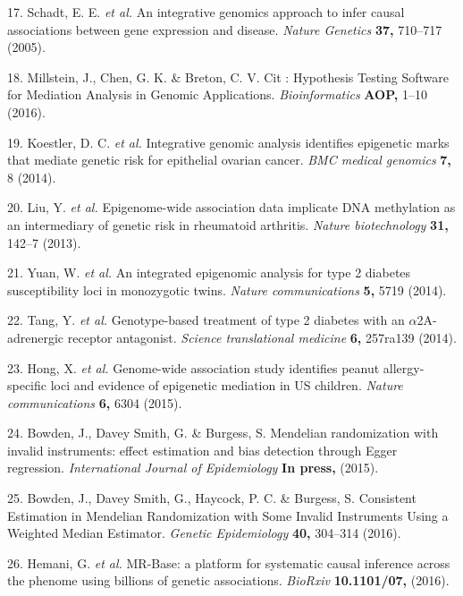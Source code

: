 \documentclass[]{article}
\begin{document}
\hypertarget{ref-Schadt2005}{}
17. Schadt, E. E. \emph{et al.} An integrative genomics approach to
infer causal associations between gene expression and disease.
\emph{Nature Genetics} \textbf{37,} 710--717 (2005).

\hypertarget{ref-Millstein2016}{}
18. Millstein, J., Chen, G. K. \& Breton, C. V. Cit : Hypothesis Testing
Software for Mediation Analysis in Genomic Applications.
\emph{Bioinformatics} \textbf{AOP,} 1--10 (2016).

\hypertarget{ref-Koestler2014}{}
19. Koestler, D. C. \emph{et al.} Integrative genomic analysis
identifies epigenetic marks that mediate genetic risk for epithelial
ovarian cancer. \emph{BMC medical genomics} \textbf{7,} 8 (2014).

\hypertarget{ref-Liu2013}{}
20. Liu, Y. \emph{et al.} Epigenome-wide association data implicate DNA
methylation as an intermediary of genetic risk in rheumatoid arthritis.
\emph{Nature biotechnology} \textbf{31,} 142--7 (2013).

\hypertarget{ref-Yuan2014}{}
21. Yuan, W. \emph{et al.} An integrated epigenomic analysis for type 2
diabetes susceptibility loci in monozygotic twins. \emph{Nature
communications} \textbf{5,} 5719 (2014).

\hypertarget{ref-Tang2014}{}
22. Tang, Y. \emph{et al.} Genotype-based treatment of type 2 diabetes
with an \(\alpha\)2A-adrenergic receptor antagonist. \emph{Science
translational medicine} \textbf{6,} 257ra139 (2014).

\hypertarget{ref-Hong2015}{}
23. Hong, X. \emph{et al.} Genome-wide association study identifies
peanut allergy-specific loci and evidence of epigenetic mediation in US
children. \emph{Nature communications} \textbf{6,} 6304 (2015).

\hypertarget{ref-Bowden2015}{}
24. Bowden, J., Davey Smith, G. \& Burgess, S. Mendelian randomization
with invalid instruments: effect estimation and bias detection through
Egger regression. \emph{International Journal of Epidemiology}
\textbf{In press,} (2015).

\hypertarget{ref-Bowden2016b}{}
25. Bowden, J., Davey Smith, G., Haycock, P. C. \& Burgess, S.
Consistent Estimation in Mendelian Randomization with Some Invalid
Instruments Using a Weighted Median Estimator. \emph{Genetic
Epidemiology} \textbf{40,} 304--314 (2016).

\hypertarget{ref-Hemani2016}{}
26. Hemani, G. \emph{et al.} MR-Base: a platform for systematic causal
inference across the phenome using billions of genetic associations.
\emph{BioRxiv} \textbf{10.1101/07,} (2016).
\end{document}
